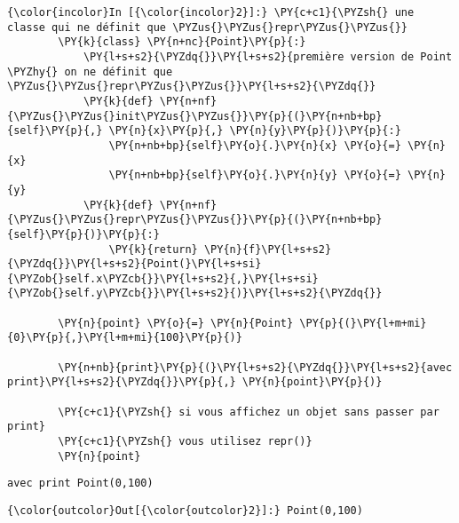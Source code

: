     \begin{Verbatim}[commandchars=\\\{\}]
{\color{incolor}In [{\color{incolor}2}]:} \PY{c+c1}{\PYZsh{} une classe qui ne définit que \PYZus{}\PYZus{}repr\PYZus{}\PYZus{}}
        \PY{k}{class} \PY{n+nc}{Point}\PY{p}{:}
            \PY{l+s+s2}{\PYZdq{}}\PY{l+s+s2}{première version de Point \PYZhy{} on ne définit que \PYZus{}\PYZus{}repr\PYZus{}\PYZus{}}\PY{l+s+s2}{\PYZdq{}}
            \PY{k}{def} \PY{n+nf}{\PYZus{}\PYZus{}init\PYZus{}\PYZus{}}\PY{p}{(}\PY{n+nb+bp}{self}\PY{p}{,} \PY{n}{x}\PY{p}{,} \PY{n}{y}\PY{p}{)}\PY{p}{:}
                \PY{n+nb+bp}{self}\PY{o}{.}\PY{n}{x} \PY{o}{=} \PY{n}{x}
                \PY{n+nb+bp}{self}\PY{o}{.}\PY{n}{y} \PY{o}{=} \PY{n}{y}
            \PY{k}{def} \PY{n+nf}{\PYZus{}\PYZus{}repr\PYZus{}\PYZus{}}\PY{p}{(}\PY{n+nb+bp}{self}\PY{p}{)}\PY{p}{:}
                \PY{k}{return} \PY{n}{f}\PY{l+s+s2}{\PYZdq{}}\PY{l+s+s2}{Point(}\PY{l+s+si}{\PYZob{}self.x\PYZcb{}}\PY{l+s+s2}{,}\PY{l+s+si}{\PYZob{}self.y\PYZcb{}}\PY{l+s+s2}{)}\PY{l+s+s2}{\PYZdq{}}
            
        \PY{n}{point} \PY{o}{=} \PY{n}{Point} \PY{p}{(}\PY{l+m+mi}{0}\PY{p}{,}\PY{l+m+mi}{100}\PY{p}{)}
        
        \PY{n+nb}{print}\PY{p}{(}\PY{l+s+s2}{\PYZdq{}}\PY{l+s+s2}{avec print}\PY{l+s+s2}{\PYZdq{}}\PY{p}{,} \PY{n}{point}\PY{p}{)}
        
        \PY{c+c1}{\PYZsh{} si vous affichez un objet sans passer par print}
        \PY{c+c1}{\PYZsh{} vous utilisez repr()}
        \PY{n}{point}
\end{Verbatim}


    \begin{Verbatim}[commandchars=\\\{\}]
avec print Point(0,100)

    \end{Verbatim}

\begin{Verbatim}[commandchars=\\\{\}]
{\color{outcolor}Out[{\color{outcolor}2}]:} Point(0,100)
\end{Verbatim}
            
